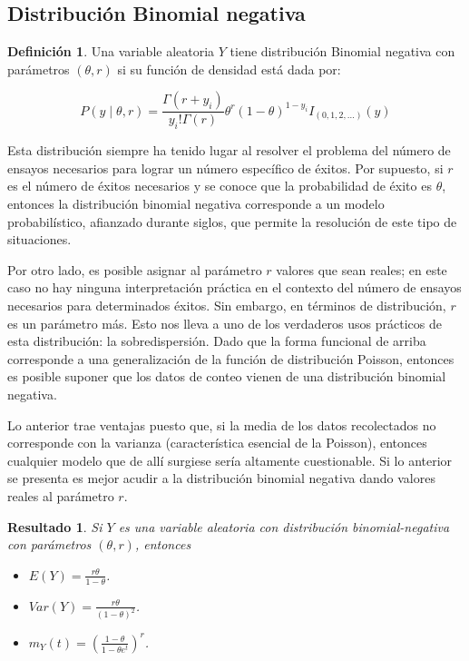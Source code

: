 \documentclass[
  10pt,
  spanish,
]{book}
\providecommand{\tightlist}{%
  \setlength{\itemsep}{0pt}\setlength{\parskip}{0pt}}
\newtheorem{proposition}{Resultado}[chapter]
\theoremstyle{definition}
\newtheorem{definition}{Definición}[chapter]
\theoremstyle{definition}
\theoremstyle{definition}
\theoremstyle{definition}
\theoremstyle{remark}
\begin{document}
\hypertarget{distribuciuxf3n-binomial-negativa}{%
\subsection{Distribución Binomial negativa}\label{distribuciuxf3n-binomial-negativa}}

\begin{definition}
\protect\hypertarget{def:unnamed-chunk-11}{}{\label{def:unnamed-chunk-11} }Una variable aleatoria \(Y\) tiene distribución Binomial negativa con parámetros \((\theta, r)\) si su función de densidad está dada por:

\begin{equation}
P(y\mid \theta, r)=\frac{\Gamma(r+y_i)}{y_i!\Gamma(r)}\theta^r(1-\theta)^{1-y_i}I_{(0,1,2,\ldots)}(y)
\end{equation}
\end{definition}

Esta distribución siempre ha tenido lugar al resolver el problema del número de ensayos necesarios para lograr un número específico de éxitos. Por supuesto, si \(r\) es el número de éxitos necesarios y se conoce que la probabilidad de éxito es \(\theta\), entonces la distribución binomial negativa corresponde a un modelo probabilístico, afianzado durante siglos, que permite la resolución de este tipo de situaciones.

Por otro lado, es posible asignar al parámetro \(r\) valores que sean reales; en este caso no hay ninguna interpretación práctica en el contexto del número de ensayos necesarios para determinados éxitos. Sin embargo, en términos de distribución, \(r\) es un parámetro más. Esto nos lleva a uno de los verdaderos usos prácticos de esta distribución: la sobredispersión. Dado que la forma funcional de arriba corresponde a una generalización de la función de distribución Poisson, entonces es posible suponer que los datos de conteo vienen de una distribución binomial negativa.

Lo anterior trae ventajas puesto que, si la media de los datos recolectados no corresponde con la varianza (característica esencial de la Poisson), entonces cualquier modelo que de allí surgiese sería altamente cuestionable. Si lo anterior se presenta es mejor acudir a la distribución binomial negativa dando valores reales al parámetro \(r\).

\begin{proposition}
\protect\hypertarget{prp:unnamed-chunk-12}{}{\label{prp:unnamed-chunk-12} }Si \(Y\) es una variable aleatoria con distribución binomial-negativa con parámetros \((\theta, r)\), entonces

\begin{itemize}
\tightlist
\item
  \(E(Y)=\frac{r\theta}{1-\theta}\).
\item
  \(Var(Y)=\frac{r\theta}{(1-\theta)^2}\).
\item
  \(m_Y(t)=\left(\frac{1-\theta}{1-\theta e^t}\right)^r\).
\end{itemize}
\end{proposition}
\end{document}
